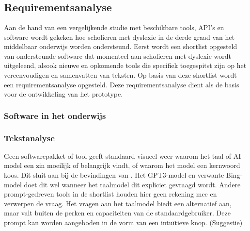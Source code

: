 
\chapter{}%
\label{ch:methodologie}


\section{Requirementsanalyse}

Aan de hand van een vergelijkende studie met beschikbare tools, API's en software wordt gekeken hoe scholieren met dyslexie in de derde graad van het middelbaar onderwijs worden ondersteund. Eerst wordt een shortlist opgesteld van ondersteunde software dat momenteel aan scholieren met dyslexie wordt uitgeleend, alsook nieuwe en opkomende tools die specifiek toegespitst zijn op het vereenvoudigen en samenvatten van teksten. Op basis van deze shortlist wordt een requirementsanalyse opgesteld. Deze requirementsanalyse dient als de basis voor de ontwikkeling van het prototype.

\subsection{Software in het onderwijs}

\subsection{Tekstanalyse}



Geen softwarepakket of tool geeft standaard visueel weer waarom het taal of AI-model een zin moeilijk of belangrijk vindt, of waarom het model een kernwoord koos. Dit sluit aan bij de bevindingen van \textcite{Gooding2022}. Het GPT3-model en verwante Bing-model doet dit wel wanneer het taalmodel dit expliciet gevraagd wordt. Andere prompt-gedreven tools in de shortlist houden hier geen rekening mee en verwerpen de vraag. Het vragen aan het taalmodel biedt een alternatief aan, maar valt buiten de perken en capaciteiten van de standaardgebruiker. Deze prompt kan worden aangeboden in de vorm van een intuïtieve knop. (Suggestie)

